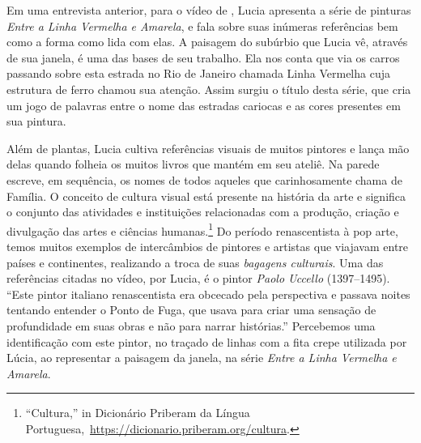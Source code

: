 Em uma entrevista anterior, para o vídeo de \textcite{cupello2007laguna},
Lucia apresenta a série de pinturas \emph{Entre a Linha Vermelha e
	Amarela}, e fala sobre suas inúmeras referências bem como a forma como
lida com elas. A paisagem do subúrbio que Lucia vê, através de sua
janela, é uma das bases de seu trabalho. Ela nos conta que via os
carros passando sobre esta estrada no Rio de Janeiro chamada Linha
Vermelha cuja estrutura de ferro chamou sua atenção. Assim surgiu o
título desta série, que cria um jogo de palavras entre o nome das
estradas cariocas e as cores presentes em sua pintura.

Além de plantas, Lucia cultiva referências visuais de muitos pintores e
lança mão delas quando folheia os muitos livros que mantém em seu
ateliê. Na parede escreve, em sequência, os nomes de todos aqueles que
carinhosamente chama de Família. O conceito de cultura visual está
presente na história da arte e significa o conjunto das atividades e
instituições relacionadas com a produção, criação e divulgação das
artes e ciências humanas.\footnote{\enquote{Cultura,} in
	Dicionário Priberam da Língua
	Portuguesa,~\url{https://dicionario.priberam.org/cultura}.} Do período renascentista à pop arte, temos muitos
exemplos de intercâmbios de pintores e artistas que viajavam entre
países e continentes, realizando a troca de suas \emph{bagagens
	culturais}. Uma das referências citadas no vídeo, por Lucia, é o pintor
\emph{Paolo Uccello} (1397--1495). \enquote{Este pintor italiano
	renascentista era obcecado pela perspectiva e passava noites tentando
	entender o Ponto de Fuga, que usava para criar uma sensação de
	profundidade em suas obras e não para narrar histórias.} Percebemos uma
identificação com este pintor, no traçado de linhas com a fita crepe
utilizada por Lúcia, ao representar a paisagem da janela, na série
\emph{Entre a Linha Vermelha e Amarela}.


